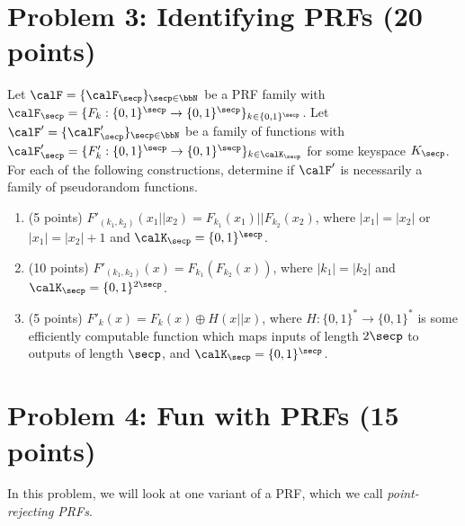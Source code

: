 \documentclass{article}
\begin{document}
\section*{Problem 3: Identifying PRFs (20 points)}
Let $\calF = \{\calF_{\secp}\}_{\secp \in \bbN}$ be a PRF family with $\calF_{\secp} = \{F_k: \{0, 1\}^{\secp} \to \{0,1\}^{\secp}\}_{k \in \{0,1\}^{\secp}}$. Let $\calF' = \{\calF'_{\secp}\}_{\secp \in \bbN}$ be a family of functions with $\calF'_{\secp} = \{F'_k: \{0, 1\}^{\secp} \to \{0,1\}^{\secp}\}_{k \in \calK_\secp}$ for some keyspace $K_{\secp}$. For each of the following constructions, determine if $\calF'$ is necessarily a family of pseudorandom functions.
\begin{enumerate}
    \item (5 points) $F'_{(k_1, k_2)}(x_1 || x_2) = F_{k_1}(x_1) || F_{k_2}(x_2)$, where $|x_1| = |x_2|$ or $|x_1| = |x_2| + 1$ and $\calK_\secp = \{0, 1\}^{\secp}$.
    \item (10 points) $F'_{(k_1, k_2)}(x) = F_{k_1}(F_{k_2}(x))$, where $|k_1| = |k_2|$ and $\calK_{\secp} = \{0, 1\}^{2\secp}$.
    \item (5 points) $F'_k(x) = F_k(x) \oplus H(x || x)$, where $H: \{0, 1\}^{*} \to \{0, 1\}^{*}$ is some efficiently computable function which maps inputs of length $2\secp$ to outputs of length $\secp$, and $\calK_{\secp} = \{0, 1\}^{\secp}$.
\end{enumerate}

\section*{Problem 4: Fun with PRFs (15 points)}
\newcommand{\PointRejectKey}{\mathsf{PointRejectKey}}
\newcommand{\Eval}{\mathsf{Eval}}
\newcommand{\st}{\mathsf{st}}

In this problem, we will look at one variant of a PRF, which we call \emph{point-rejecting PRFs}.
\end{document}
